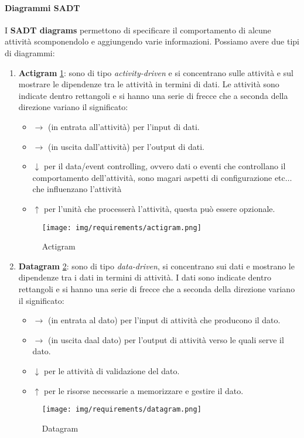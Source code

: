 \paragraph{Diagrammi SADT}
I \textbf{SADT diagrams} permettono di specificare il comportamento di alcune
attività scomponendolo e aggiungendo varie informazioni. Possiamo avere due tipi
di diagrammi:
\begin{enumerate}
      \item \textbf{Actigram} \ref{fig:actigram}: sono di tipo \textit{activity-driven}
            e si concentrano sulle attività e sul mostrare le dipendenze tra le attività
            in termini di dati. Le attività sono indicate dentro rettangoli e si hanno
            una serie di frecce che a seconda della direzione variano il significato:
            \begin{itemize}
                  \item $\to$ (in entrata all'attività) per l'input di dati.
                  \item $\to$ (in uscita dall'attività) per l'output di dati.
                  \item $\downarrow$ per il data/event controlling, ovvero dati o
                        eventi che controllano il comportamento dell'attività, sono magari
                        aspetti di configurazione etc$\dots$ che influenzano l'attività
                  \item $\uparrow$ per l'unità che processerà l'attività, questa può
                        essere opzionale.
            \end{itemize}
            \begin{figure}[!ht]
                  \centering
                  \texttt{[image: img/requirements/actigram.png]}
                  \caption{Actigram}
                  \label{fig:actigram}
            \end{figure}
      \item \textbf{Datagram} \ref{fig:datagram}: sono di tipo \textit{data-driven},
            si concentrano sui dati e mostrano le dipendenze tra i dati in termini di
            attività. I dati sono indicate dentro rettangoli e si hanno una serie di frecce
            che a seconda della direzione variano il significato:
            \begin{itemize}
                  \item $\to$ (in entrata al dato) per l'input di attività che producono il dato.
                  \item $\to$ (in uscita daal dato) per l'output di attività verso le quali serve il dato.
                  \item $\downarrow$ per le attività di validazione del dato.
                  \item $\uparrow$ per le risorse necessarie a memorizzare e gestire il dato.
            \end{itemize}
            \begin{figure}[!ht]
                  \centering
                  \texttt{[image: img/requirements/datagram.png]}
                  \caption{Datagram}
                  \label{fig:datagram}
            \end{figure}
\end{enumerate}
